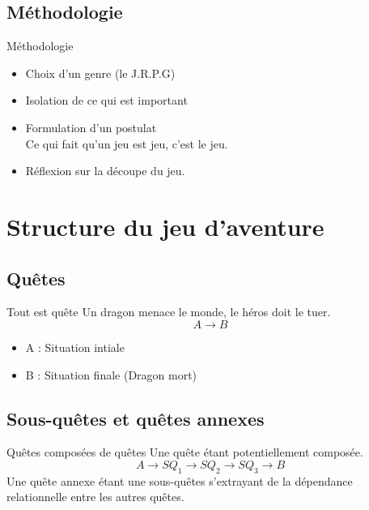 \documentclass{beamer}
\begin{document}
\subsection{Méthodologie}
\begin{frame}{Méthodologie}
  \begin{itemize}
    \item Choix d'un genre (le J.R.P.G)
    \item Isolation de ce qui est important
    \item Formulation d'un postulat \\ 
      Ce qui fait qu'un jeu est jeu, c'est le jeu.
    \item Réflexion sur la découpe du jeu.
  \end{itemize}
\end{frame}

\section{Structure du jeu d'aventure}
\subsection{Quêtes}
\begin{frame}{Tout est quête}
Un dragon menace le monde, le héros doit le tuer. 
  \newline
  $$A \rightarrow B$$
  \begin{itemize}
    \item A : Situation intiale
    \item B : Situation finale (Dragon mort)
  \end{itemize}
\end{frame}

\subsection{Sous-quêtes et quêtes annexes}
\begin{frame}{Quêtes composées de quêtes}
  Une quête étant potentiellement composée.
  \newline
  $$A \rightarrow SQ_1 \rightarrow SQ_2 \rightarrow SQ_3 \rightarrow B $$
  \newline
  Une quête annexe étant une sous-quêtes s'extrayant de la dépendance relationnelle entre les autres quêtes.
\end{frame}
\end{document}
